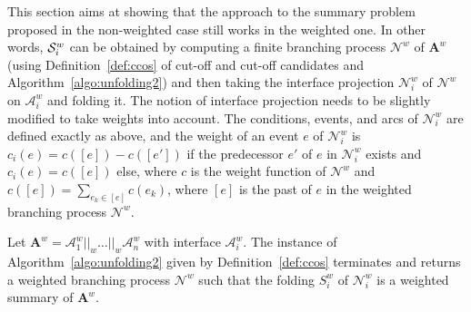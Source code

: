 \documentclass{llncs}
\def\A{\mathcal{A}}
\def\prod{\mathbf{A}}
\def\N{\mathcal{N}}
\def\S{\mathcal{S}}
\renewcommand{\S}{{\cal S}}
\begin{document}
This section aims at showing that the approach to the summary problem proposed in the non-weighted case still works in the weighted one.
In other words, $\S^w_i$ can be obtained by computing a finite branching process $\N^w$ of $\prod^w$ (using Definition~\ref{def:ccos} of cut-off and cut-off candidates and Algorithm~\ref{algo:unfolding2}) and then taking the interface projection $\N^w_i$ of $\N^w$ on $\A_i^w$ and folding it.
The notion of interface projection needs to be slightly modified to take weights into account.
The conditions, events, and arcs of $\N^w_i$ are defined exactly as above, and the weight of an event $e$ of $\N^w_i$ is $c_i(e)=c([e])-c([e'])$ if the predecessor $e'$ of $e$ in $\N^w_i$ exists and $c_i(e)=c([e])$ else, where $c$ is the weight function of $\N^w$ and $c([e])=\sum_{e_k\in[e]}c(e_k)$, where $[e]$ is the past of $e$ in the weighted branching process $\N^w$.

\begin{theorem}
\label{thm:costs}
Let $\prod^w=\A_1^w||_w\dots||_w\A_n^w$ with interface $\A_i^w$.
The instance of Algorithm~\ref{algo:unfolding2} given by Definition~\ref{def:ccos} terminates and returns a weighted branching process $\N^w$ such that the folding $S_i^w$ of $\N_i^w$ is a weighted summary of $\prod^w$. 
\end{theorem}
\end{document}
